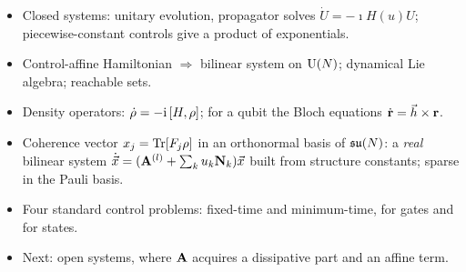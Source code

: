 \documentclass[handoutsbeamer.tex]{subfiles}
\begin{document}
\begin{frame}
\begin{itemize}\setlength\itemsep{0.4em}
    \item Closed systems: unitary evolution, propagator solves $\dot U=-\imath H(u)U$; piecewise-constant controls give a product of exponentials.
    \item Control-affine Hamiltonian $\Rightarrow$ bilinear system on $\Un[N]$; dynamical Lie algebra; reachable sets.
    \item Density operators: $\dot\rho=-\imath\comm{H}{\rho}$; for a qubit the Bloch equations $\dot\Bloch=\vec h\times\Bloch$.
    \item Coherence vector $x_j=\Tr[F_j\rho]$ in an orthonormal basis of $\liesu[N]$: a \emph{real} bilinear system $\dot{\vec x}=(\Amat^{(l)}+\sum_ku_k\Nmat_k)\vec x$ built from structure constants; sparse in the Pauli basis.
    \item Four standard control problems: fixed-time and minimum-time, for gates and for states.
    \item Next: open systems, where $\Amat$ acquires a dissipative part and an affine term.
\end{itemize}
\end{frame}

\biblio
\end{document}
